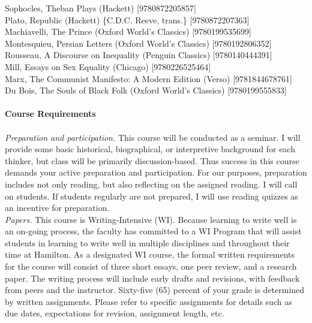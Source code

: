 \documentclass [11pt]{article}
\begin{document}
   Sophocles, Theban Plays (Hackett) [9780872205857] \\ %
   Plato, Republic (Hackett) \{C.D.C. Reeve, trans.\} [9780872207363] \\ %
   Machiavelli, The Prince (Oxford World's Classics) [9780199535699] \\ %
   Montesquieu, Persian Letters (Oxford World's Classics) [9780192806352] \\ %
   Rousseau, A Discourse on Inequality (Penguin Classics) [9780140444391] \\ %
   Mill, Essays on Sex Equality (Chicago) [9780226525464] \\ %
   Marx, The Communist Manifesto: A Modern Edition (Verso) [9781844678761] \\ %
   Du Bois, The Souls of Black Folk (Oxford World's Classics) [9780199555833] \\ %
   \ \\
\vfill\eject
   {\bf Course Requirements}\\
\\
\emph{Preparation and participation.} This course will be conducted as a seminar. I will provide some basic historical, biographical, or interpretive background for each thinker, but class will be primarily discussion-based. Thus success in this course demands your active preparation and participation. For our purposes, preparation includes not only reading, but also reflecting on the assigned reading. I will call on students. If students regularly are not prepared, I will use reading quizzes as an incentive for preparation. \\

\emph{Papers.} This course is Writing-Intensive (WI). Because learning to write well is an on-going process, the faculty has committed to a WI Program that will assist students in learning to write well in multiple disciplines and throughout their time at Hamilton. As a designated WI course, the formal written requirements for the course will consist of three short essays, one peer review, and a research paper. The writing process will include early drafts and revisions, with feedback from peers and the instructor. Sixty-five (65) percent of your grade is determined by written assignments. Please refer to specific assignments for details such as due dates, expectations for revision, assignment length, etc.\\
\end{document}

